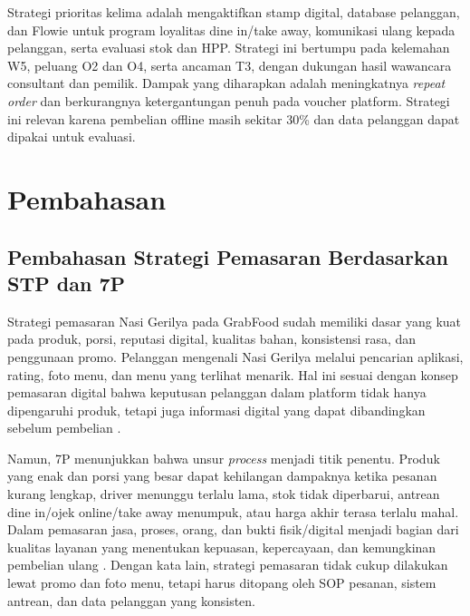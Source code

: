 Strategi prioritas kelima adalah mengaktifkan stamp digital, database pelanggan, dan Flowie untuk program loyalitas dine in/take away, komunikasi ulang kepada pelanggan, serta evaluasi stok dan HPP. Strategi ini bertumpu pada kelemahan W5, peluang O2 dan O4, serta ancaman T3, dengan dukungan hasil wawancara consultant dan pemilik. Dampak yang diharapkan adalah meningkatnya \textit{repeat order} dan berkurangnya ketergantungan penuh pada voucher platform. Strategi ini relevan karena pembelian offline masih sekitar 30\% dan data pelanggan dapat dipakai untuk evaluasi.

\section{Pembahasan}

\subsection{Pembahasan Strategi Pemasaran Berdasarkan STP dan 7P}
Strategi pemasaran Nasi Gerilya pada GrabFood sudah memiliki dasar yang kuat pada produk, porsi, reputasi digital, kualitas bahan, konsistensi rasa, dan penggunaan promo. Pelanggan mengenali Nasi Gerilya melalui pencarian aplikasi, rating, foto menu, dan menu yang terlihat menarik. Hal ini sesuai dengan konsep pemasaran digital bahwa keputusan pelanggan dalam platform tidak hanya dipengaruhi produk, tetapi juga informasi digital yang dapat dibandingkan sebelum pembelian \parencite{kotler2023principlesmarketing,chaffey2022digitalmarketing,sophia2025rendanggadih}.

Namun, 7P menunjukkan bahwa unsur \textit{process} menjadi titik penentu. Produk yang enak dan porsi yang besar dapat kehilangan dampaknya ketika pesanan kurang lengkap, driver menunggu terlalu lama, stok tidak diperbarui, antrean dine in/ojek online/take away menumpuk, atau harga akhir terasa terlalu mahal. Dalam pemasaran jasa, proses, orang, dan bukti fisik/digital menjadi bagian dari kualitas layanan yang menentukan kepuasan, kepercayaan, dan kemungkinan pembelian ulang \parencite{wirtz2024servicesmarketing,kotler2023principlesmarketing}. Dengan kata lain, strategi pemasaran tidak cukup dilakukan lewat promo dan foto menu, tetapi harus ditopang oleh SOP pesanan, sistem antrean, dan data pelanggan yang konsisten.

